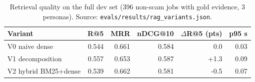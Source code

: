 \begin{table}[t]\centering\small
\caption{Retrieval quality on the full dev set (396 non-scam jobs with gold evidence, 3 personas). Source: \texttt{evals/results/rag\_variants.json}.}\label{tab:rag}
\begin{tabular}{lrrrrr}\toprule Variant & R@5 & MRR & nDCG@10 & $\Delta$R@5 (pts) & p95 s\\\midrule
V0 naive dense & 0.544 & 0.661 & 0.584 & 0.0 & 0.03 \\
V1 decomposition & 0.557 & 0.653 & 0.587 & +1.3 & 0.09 \\
V2 hybrid BM25+dense & 0.539 & 0.662 & 0.581 & -0.5 & 0.07 \\
\bottomrule\end{tabular}\end{table}